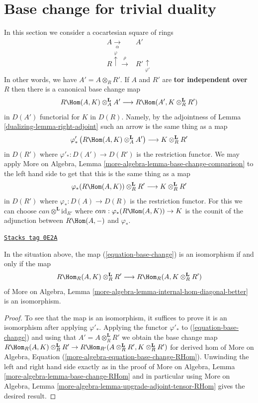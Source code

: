 \section{Base change for trivial duality}
\label{dualizing-section-base-change-trivial-duality}
In this section we consider a cocartesian square of rings
$$
\begin{array}{cc}A \underset{\alpha}{\longrightarrow} & A' \\ R \overset{\varphi}{\uparrow}\overset{\rho}{\longrightarrow} & R' \underset{\varphi'}{\uparrow}\end{array}
$$
In other words, we have $A' = A \otimes_R R'$. If $A$ and $R'$
are {\bf tor independent over} $R$ then there is a canonical base change map
\begin{equation}
\label{equation-base-change}
R\Hom(A, K) \otimes_A^\mathbf{L} A'
\longrightarrow
R\Hom(A', K \otimes_R^\mathbf{L} R')
\end{equation}
in $D(A')$ functorial for $K$ in $D(R)$. Namely, by the adjointness
of Lemma \ref{dualizing-lemma-right-adjoint} such an arrow is the same thing as a map
$$
\varphi'_*\left(R\Hom(A, K) \otimes_A^\mathbf{L} A'\right)
\longrightarrow
K \otimes_R^\mathbf{L} R'
$$
in $D(R')$ where $\varphi'_* : D(A') \to D(R')$ is the restriction functor.
We may apply
More on Algebra, Lemma \ref{more-algebra-lemma-base-change-comparison}
to the left hand side to get that this is the same thing as a map
$$
\varphi_*(R\Hom(A, K)) \otimes_R^\mathbf{L} R'
\longrightarrow
K \otimes_R^\mathbf{L} R'
$$
in $D(R')$ where $\varphi_* : D(A) \to D(R)$ is the restriction functor.
For this we can choose $can \otimes^\mathbf{L} \text{id}_{R'}$
where $can : \varphi_*(R\Hom(A, K)) \to K$ is the
counit of the adjunction between $R\Hom(A, -)$ and $\varphi_*$.

\begin{lemma}
\label{dualizing-lemma-check-base-change-is-iso}
\href{https://stacks.math.columbia.edu/tag/0E2A}{\texttt{Stacks tag 0E2A}}

In the situation above, the map (\ref{equation-base-change})
is an isomorphism if and only if the map
$$
R\Hom_R(A, K) \otimes_R^\mathbf{L} R'
\longrightarrow
R\Hom_R(A, K \otimes_R^\mathbf{L} R')
$$
of More on Algebra, Lemma
\ref{more-algebra-lemma-internal-hom-diagonal-better} is an isomorphism.
\end{lemma}

\begin{proof}
To see that the map is an isomorphism, it suffices to prove it
is an isomorphism after applying $\varphi'_*$.
Applying the functor $\varphi'_*$ to (\ref{equation-base-change})
and using that $A' = A \otimes_R^\mathbf{L} R'$
we obtain the base change map
$R\Hom_R(A, K) \otimes_R^\mathbf{L} R' \to
R\Hom_{R'}(A \otimes_R^\mathbf{L} R', K \otimes_R^\mathbf{L} R')$
for derived hom of
More on Algebra, Equation (\ref{more-algebra-equation-base-change-RHom}).
Unwinding the left and right hand side exactly as in the proof of
More on Algebra, Lemma \ref{more-algebra-lemma-base-change-RHom}
and in particular using
More on Algebra, Lemma \ref{more-algebra-lemma-upgrade-adjoint-tensor-RHom}
gives the desired result.
\end{proof}

